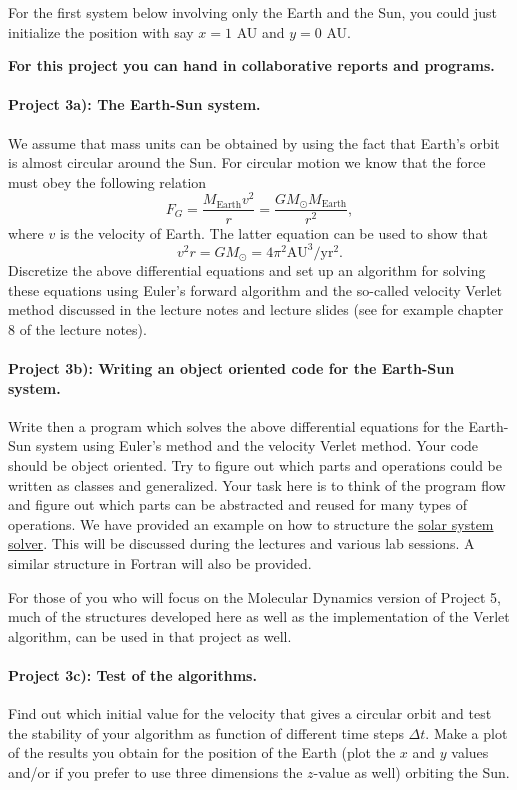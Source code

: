 \documentclass[%
oneside,                 %
final,                   %
10pt]{article}
\begin{document}
For the first system below involving only the Earth and the Sun, you could just initialize the position with say $x=1$ AU
and $y=0$ AU. 

\textbf{For this project you can hand in collaborative reports and programs.}

\paragraph{Project 3a): The Earth-Sun system.}
We assume that mass units can be obtained by using the fact that Earth's orbit is almost circular around the Sun.
For circular motion we know that the force must obey the following relation
\[
F_G= \frac{M_{\mathrm{Earth}}v^2}{r}=\frac{GM_{\odot}M_{\mathrm{Earth}}}{r^2},
\]
where $v$ is the velocity of Earth. 
The latter equation can be used to show that
\[
v^2r=GM_{\odot}=4\pi^2\mathrm{AU}^3/\mathrm{yr}^2.
\]
Discretize the above differential equations and set up an algorithm for solving these equations using Euler's forward algorithm and the so-called velocity Verlet method discussed in the lecture notes and lecture slides (see for example chapter 8 of the lecture notes).

\paragraph{Project 3b): Writing an object oriented code for the Earth-Sun system.}
Write then a program which solves the above differential equations for the Earth-Sun system
using Euler's  method and the velocity Verlet method. 
Your code should be object oriented. Try to figure out which parts and operations could be written as classes
and generalized.  
Your task here is to think of the program flow and figure out which parts can be abstracted and reused for many types of operations. We have provided an example on how to structure
the \href{{https://github.com/mortele/solar-system-fys3150}}{solar system solver}. This will be discussed during the lectures and various lab sessions. A similar structure in Fortran will also be provided. 

For those of you who will focus on the Molecular Dynamics version of Project 5, much of the structures developed here as well as the implementation of the Verlet algorithm, can be used in that project as well.

\paragraph{Project 3c): Test of the algorithms.}
Find out which initial value for the velocity that gives a circular orbit
and test the stability of your algorithm as function of different time steps $\Delta t$. 
Make a plot of the results you obtain for the position of the Earth (plot the $x$ and $y$ values and/or if you prefer to use three dimensions the $z$-value as well) orbiting  the Sun.
\end{document}
